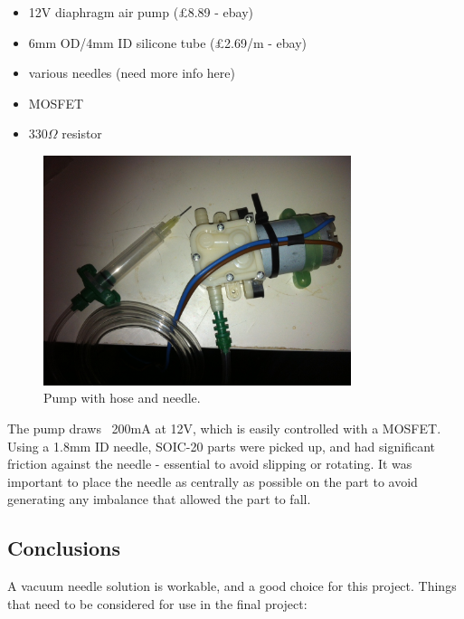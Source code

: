 \documentclass[a4paper,11pt]{article}  %
\begin{document}
\begin{itemize} \itemsep0em
	\item	12V diaphragm air pump (£8.89 - ebay)
	\item	6mm OD/4mm ID silicone tube (£2.69/m - ebay)
	\item	various needles (need more info here)
	\item	MOSFET
	\item	330$\Omega$ resistor
\end{itemize}

\begin{figure}[ht!]
\centering
\includegraphics[width=90mm]{resources/pump_and_hose.jpg}
\caption{Pump with hose and needle.}
\label{hose and needle}
\end{figure}

The pump draws ~200mA at 12V, which is easily controlled with a MOSFET. Using a 1.8mm ID needle, SOIC-20 parts were picked up, and had significant friction against the needle - essential to avoid slipping or rotating. It was important to place the needle as centrally as possible on the part to avoid generating any imbalance that allowed the part to fall. 

\subsection{Conclusions}
A vacuum needle solution is workable, and a good choice for this project. Things that need to be considered for use in the final project:
\end{document}
